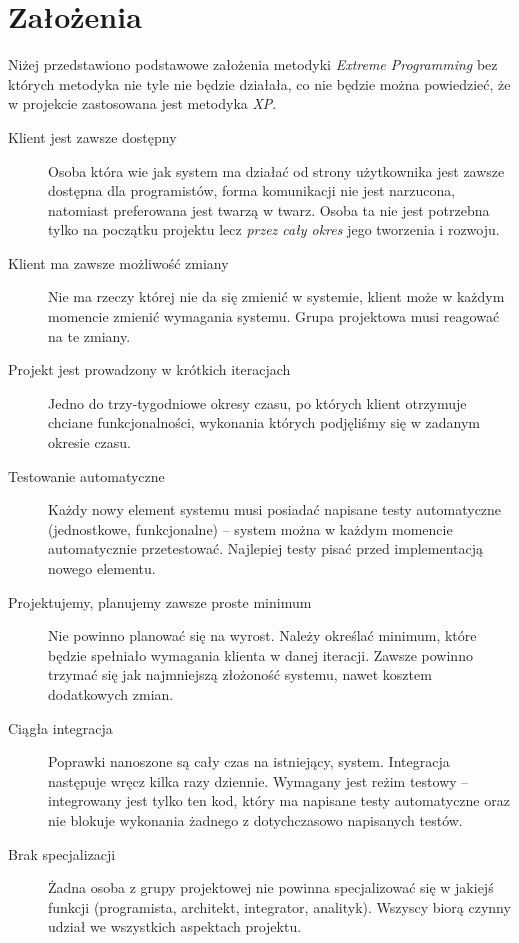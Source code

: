 \section{Założenia}
\label{sec:ZMTOzalozenia}

Niżej przedstawiono podstawowe założenia metodyki \textit{Extreme Programming} bez których metodyka nie tyle nie będzie działała, co nie będzie można powiedzieć, że w projekcie zastosowana jest metodyka \textit{XP}.

\begin{description}
    \item[Klient jest zawsze dostępny] Osoba która wie jak system ma działać od strony użytkownika jest zawsze dostępna dla programistów, forma komunikacji nie jest narzucona, natomiast preferowana jest twarzą w twarz. Osoba ta nie jest potrzebna tylko na początku projektu lecz \emph{przez cały okres} jego tworzenia i rozwoju.
    \item[Klient ma zawsze możliwość zmiany] Nie ma rzeczy której nie da się zmienić w systemie, klient może w każdym momencie zmienić wymagania systemu. Grupa projektowa musi reagować na te zmiany.
    \item[Projekt jest prowadzony w krótkich iteracjach] Jedno do trzy-tygodniowe okresy czasu, po których klient otrzymuje chciane funkcjonalności, wykonania których podjęliśmy się w zadanym okresie czasu.
    \item[Testowanie automatyczne] Każdy nowy element systemu musi posiadać napisane testy automatyczne (jednostkowe, funkcjonalne) -- system można w każdym momencie automatycznie przetestować. Najlepiej testy pisać przed implementacją nowego elementu.
    \item[Projektujemy, planujemy zawsze proste minimum] Nie powinno planować się na wyrost. Należy określać minimum, które będzie spełniało wymagania klienta w danej iteracji. Zawsze powinno trzymać się jak najmniejszą złożoność systemu, nawet kosztem dodatkowych zmian.
    \item[Ciągła integracja] Poprawki nanoszone są cały czas na istniejący, system. Integracja następuje wręcz kilka razy dziennie. Wymagany jest reżim testowy -- integrowany jest tylko ten kod, który ma napisane testy automatyczne oraz nie blokuje wykonania żadnego z dotychczasowo napisanych testów.
    \item[Brak specjalizacji] Żadna osoba z grupy projektowej nie powinna specjalizować się w jakiejś funkcji (programista, architekt, integrator, analityk). Wszyscy biorą czynny udział we wszystkich aspektach projektu.

\end{description}
